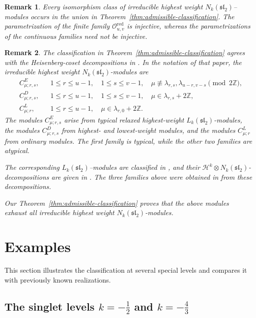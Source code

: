 \documentclass[11 pt]{amsart}
\newtheorem{remark}{Remark}
\theoremstyle{definition}
\theoremstyle{plain}
\begin{document}
\begin{remark}
Every isomorphism class of irreducible highest weight
$N_k(\mathfrak{sl}_2)$--modules occurs in the union in
Theorem~\ref{thm:admissible-classification}. The parametrization of the
finite family $\mathcal O^{\mathrm{red}}_{u,v}$ is injective, whereas
the parametrizations of the continuous families need not be injective.
\end{remark}

\begin{remark}
The classification in
Theorem~\ref{thm:admissible-classification} agrees with the
Heisenberg-coset decompositions in \cite{ACR}. In the notation of that
paper, the irreducible highest weight
$N_k(\mathfrak{sl}_2)$-modules are
\[
\begin{aligned}
&C^E_{\mu;r,s},
&&1\leq r\leq u-1,\quad 1\leq s\leq v-1,\quad
\mu\not\equiv\lambda_{r,s},\lambda_{u-r,v-s}
\pmod{2\mathbb Z},\\
&C^D_{\mu;r,s},
&&1\leq r\leq u-1,\quad 1\leq s\leq v-1,\quad
\mu\in\lambda_{r,s}+2\mathbb Z,\\
&C^L_{\mu;r},
&&1\leq r\leq u-1,\quad
\mu\in\lambda_{r,0}+2\mathbb Z.
\end{aligned}
\]
The modules $C^E_{\mu;r,s}$ arise from typical relaxed highest-weight
$L_k(\mathfrak{sl}_2)$-modules, the modules $C^D_{\mu;r,s}$ from
highest- and lowest-weight modules, and the modules $C^L_{\mu;r}$ from
ordinary modules. The first family is typical, while the other two
families are atypical.

The corresponding $L_k(\mathfrak{sl}_2)$--modules are classified in
\cite[Theorem~4.0.11]{AM95}, and their
$\mathcal H^k\otimes N_k(\mathfrak{sl}_2)$-decompositions are given in
\cite[Propositions~3.1 and~3.3]{ACR}. The three families above were
obtained in \cite{ACR} from these decompositions.


Our Theorem~\ref{thm:admissible-classification} proves that the above modules exhaust all
irreducible highest weight $N_k(\mathfrak{sl}_2)$-modules.
\end{remark}
\section{Examples}

\label{sec:examples}
This section illustrates the classification at several special levels and
compares it with previously known realizations.


\subsection{The singlet levels $k=-\frac12$ and $k=-\frac43$}
\label{subsec:singlet-levels}
\end{document}
